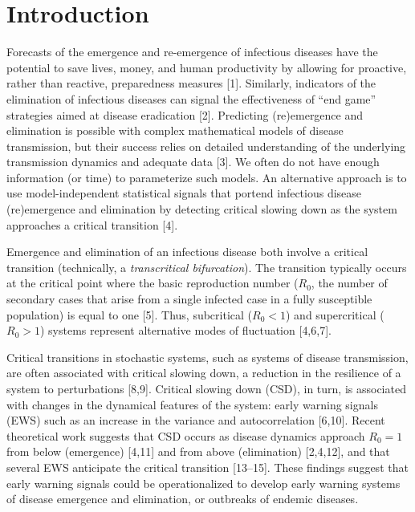 \documentclass[3p]{elsarticle} %
\begin{document}
\hypertarget{introduction}{%
\section{Introduction}\label{introduction}}

Forecasts of the emergence and re-emergence of infectious diseases have
the potential to save lives, money, and human productivity by allowing
for proactive, rather than reactive, preparedness measures {[}1{]}.
Similarly, indicators of the elimination of infectious diseases can
signal the effectiveness of ``end game'' strategies aimed at disease
eradication {[}2{]}. Predicting (re)emergence and elimination is
possible with complex mathematical models of disease transmission, but
their success relies on detailed understanding of the underlying
transmission dynamics and adequate data {[}3{]}. We often do not have
enough information (or time) to parameterize such models. An alternative
approach is to use model-independent statistical signals that portend
infectious disease (re)emergence and elimination by detecting critical
slowing down as the system approaches a critical transition {[}4{]}.

Emergence and elimination of an infectious disease both involve a
critical transition (technically, a \emph{transcritical bifurcation}).
The transition typically occurs at the critical point where the basic
reproduction number (\(R_0\), the number of secondary cases that arise
from a single infected case in a fully susceptible population) is equal
to one {[}5{]}. Thus, subcritical (\(R_0 < 1\)) and supercritical
(\(R_0 > 1\)) systems represent alternative modes of fluctuation
{[}4,6,7{]}.

Critical transitions in stochastic systems, such as systems of disease
transmission, are often associated with critical slowing down, a
reduction in the resilience of a system to perturbations {[}8,9{]}.
Critical slowing down (CSD), in turn, is associated with changes in the
dynamical features of the system: early warning signals (EWS) such as an
increase in the variance and autocorrelation {[}6,10{]}. Recent
theoretical work suggests that CSD occurs as disease dynamics approach
\(R_0 = 1\) from below (emergence) {[}4,11{]} and from above
(elimination) {[}2,4,12{]}, and that several EWS anticipate the critical
transition {[}13--15{]}. These findings suggest that early warning
signals could be operationalized to develop early warning systems of
disease emergence and elimination, or outbreaks of endemic diseases.
\end{document}
